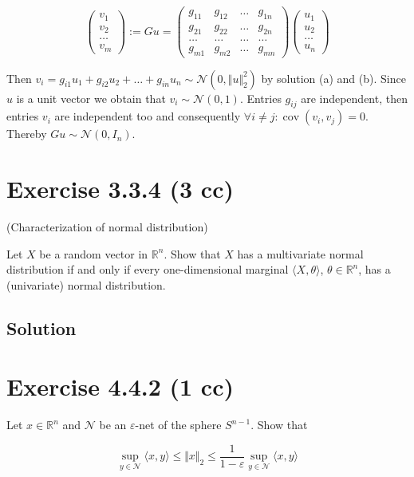 \documentclass{article}
\DeclareMathOperator{\cov}{cov}
\begin{document}
$$
\begin{pmatrix}
    v_1 \\
    v_2 \\
    \dots \\
    v_m
\end{pmatrix} :=
Gu = 
\begin{pmatrix}
    g_{11} & g_{12} & \dots & g_{1n} \\
    g_{21} & g_{22} & \dots & g_{2n} \\
    \dots & \dots & \dots & \dots \\
    g_{m1} & g_{m2} & \dots & g_{mn}
\end{pmatrix}
\begin{pmatrix}
    u_1 \\
    u_2 \\
    \dots \\
    u_n
\end{pmatrix}
$$

Then $v_i = g_{i1}u_1 + g_{i2}u_2 + \dots + g_{in}u_n \sim \mathcal N (0, \Vert u \Vert^2_2)$ by solution (a) and (b). Since $u$ is a unit vector we obtain that $v_i \sim \mathcal N (0, 1)$. Entries $g_{ij}$ are independent, then entries $v_i$ are independent too and consequently $\forall i \neq j: \cov(v_i, v_j) = 0$. Thereby $Gu \sim \mathcal N (0, I_n)$.

\section{Exercise 3.3.4 (3 cc)}

(Characterization of normal distribution)

Let $X$ be a random vector in $\mathbb R^n$. Show that $X$ has a multivariate normal distribution if and only if every one-dimensional marginal $\langle X, \theta \rangle$, $\theta \in \mathbb R^n$, has a (univariate) normal distribution.

\subsection{Solution}

\section{Exercise 4.4.2 (1 cc)}

Let $x \in \mathbb R^n$ and $ \mathcal N$ be an $\varepsilon$-net of the sphere $S^{n-1}$. Show that

$$\sup_{y \in \mathcal N} \langle x, y \rangle \leq \Vert x \Vert_2 \leq \frac{1}{1-\varepsilon}\sup_{y \in \mathcal N}\langle x, y \rangle$$
\end{document}
